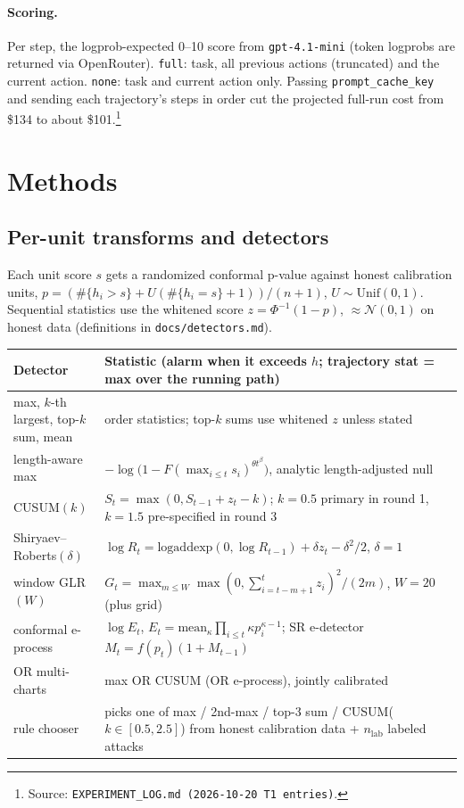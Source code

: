 \documentclass[11pt]{article}
\newcommand{\src}[1]{\footnote{Source: \nolinkurl{#1}.}}
\begin{document}
\paragraph{Scoring.} Per step, the logprob-expected 0--10 score from \texttt{gpt-4.1-mini} (token logprobs are returned via OpenRouter). \texttt{full}: task, all previous actions (truncated) and the current action. \texttt{none}: task and current action only. Passing \texttt{prompt\_cache\_key} and sending each trajectory's steps in order cut the projected full-run cost from \$134 to about \$101.\src{EXPERIMENT_LOG.md (2026-10-20 T1 entries)}

\section{Methods}

\subsection{Per-unit transforms and detectors}
Each unit score $s$ gets a randomized conformal p-value against honest calibration units, $p=(\#\{h_i>s\}+U(\#\{h_i=s\}+1))/(n+1)$, $U\sim\mathrm{Unif}(0,1)$. Sequential statistics use the whitened score $z=\Phi^{-1}(1-p)$, $\approx\mathcal N(0,1)$ on honest data (definitions in \texttt{docs/detectors.md}).

\begin{table}[!htbp]\centering\small
\begin{tabularx}{\linewidth}{@{}lX@{}}
\toprule
Detector & Statistic (alarm when it exceeds $h$; trajectory stat = max over the running path)\\
\midrule
max, $k$-th largest, top-$k$ sum, mean & order statistics; top-$k$ sums use whitened $z$ unless stated\\
length-aware max & $-\log\bigl(1-F(\max_{i\le t}s_i)^{\theta t^\beta}\bigr)$, analytic length-adjusted null\\
CUSUM$(k)$ & $S_t=\max(0,S_{t-1}+z_t-k)$; $k=0.5$ primary in round 1, $k=1.5$ pre-specified in round 3\\
Shiryaev--Roberts$(\delta)$ & $\log R_t=\mathrm{logaddexp}(0,\log R_{t-1})+\delta z_t-\delta^2/2$, $\delta=1$\\
window GLR$(W)$ & $G_t=\max_{m\le W}\max(0,\sum_{i=t-m+1}^t z_i)^2/(2m)$, $W=20$ (plus grid)\\
conformal e-process & $\log E_t$, $E_t=\mathrm{mean}_\kappa\prod_{i\le t}\kappa p_i^{\kappa-1}$; SR e-detector $M_t=f(p_t)(1+M_{t-1})$\\
OR multi-charts & max OR CUSUM (OR e-process), jointly calibrated\\
rule chooser & picks one of max / 2nd-max / top-3 sum / CUSUM($k\in[0.5,2.5]$) from honest calibration data + $n_\text{lab}$ labeled attacks\\
\bottomrule
\end{tabularx}
\end{table}
\end{document}
